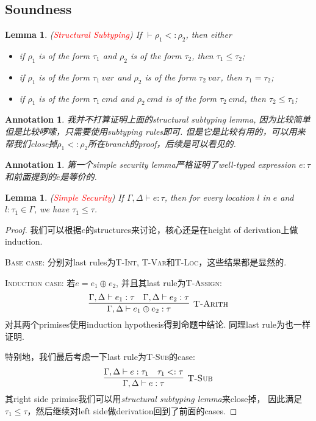 \documentclass{article}
\newtheorem{lemma}[theorem]{Lemma}
\newtheorem{annotation}[theorem]{Annotation}
\newcommand{\redt}[1]{\textcolor{red}{#1}}
\newcommand{\termtype}[2]{\ensuremath{#1:#2}}
\begin{document}
\subsection{Soundness}

\begin{lemma}
\rm (\redt{Structural Subtyping}) If $\vdash \rho_1 <: \rho_2$, then either
\begin{itemize}
	\item if $\rho_1$ is of the form $\tau_1$ and $\rho_2$ is of the form $\tau_2$, then $\tau_1 \leq \tau_2$;
	\item if $\rho_1$ is of the form $\tau_1~var$ and $\rho_2$ is of the form $\tau_2~var$, then $\tau_1 = \tau_2$;
	\item if $\rho_1$ is of the form $\tau_1~cmd$ and $\rho_2~cmd$ is of the form $\tau_2~cmd$, then $\tau_2 \leq \tau_1$;
\end{itemize}
\end{lemma}

\begin{annotation}
\rm 我并不打算证明上面的\emph{structural subtyping lemma}, 因为比较简单但是比较啰嗦，只需要使用subtyping rules即可. 但是它是比较有用的，可以用来帮我们close掉$\rho_1 <: \rho_2$所在branch的proof，后续是可以看见的.
\end{annotation}

\begin{annotation}
\rm 第一个\emph{simple security lemma}严格证明了well-typed expression $\termtype{e}{\tau}$和前面提到的$\overline{e}$是等价的. 
\end{annotation}

\begin{lemma}
\rm (\redt{Simple Security}) If $\Gamma,\Delta \vdash \termtype{e}{\tau}$, then for every location $l$ in $e$ and $\termtype{l}{\tau_1} \in \Gamma$, we have $\tau_1 \leq \tau$. 
\end{lemma}

\begin{proof}
\rm 我们可以根据$e$的structures来讨论，核心还是在height of derivation上做induction. 

\textsc{Base case}: 分别对last rules为\textsc{T-Int}, \textsc{T-Var}和\textsc{T-Loc}，这些结果都是显然的.

\textsc{Induction case}: 若$e = e_1 \oplus e_2$, 并且其last rule为\textsc{T-Assign}:
\[
	\infer[\textsc{T-Arith}]{\Gamma, \Delta \vdash \termtype{e_1 \oplus e_2}{\tau}}{\Gamma, \Delta \vdash \termtype{e_1}{\tau} & \Gamma, \Delta \vdash \termtype{e_2}{\tau}}
\]
对其两个primises使用induction hypothesis得到命题中结论. 同理last rule为也一样证明. 

特别地，我们最后考虑一下last rule为\textsc{T-Sub}的case:
\[
	\infer[\textsc{T-Sub}]{\Gamma, \Delta \vdash \termtype{e}{\tau}}{\Gamma, \Delta \vdash \termtype{e}{\tau_1} & \tau_1 <: \tau}
\]
其right side primise我们可以用\emph{structural subtyping lemma}来close掉， 因此满足$\tau_1 \leq \tau$，然后继续对left side做derivation回到了前面的cases.
\end{proof}
\end{document}
